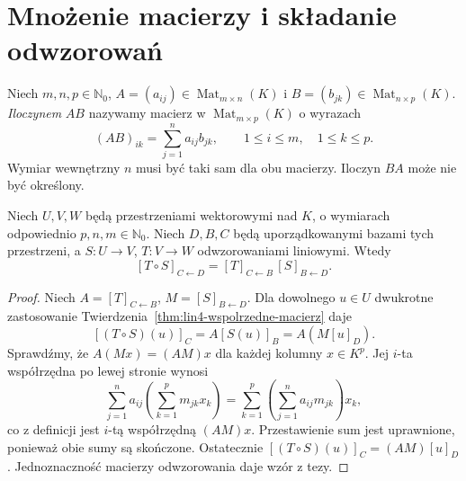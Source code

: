 \section{Mnożenie macierzy i składanie odwzorowań}
\label{sec:lin4-mnozenie}

\begin{definicja}
\label{def:lin4-iloczyn-macierzy}
Niech \(m,n,p\in\mathbb N_0\),
\(A=(a_{ij})\in\operatorname{Mat}_{m\times n}(K)\)
i \(B=(b_{jk})\in\operatorname{Mat}_{n\times p}(K)\).
\emph{Iloczynem} \(AB\) nazywamy macierz
w \(\operatorname{Mat}_{m\times p}(K)\)
o wyrazach
\[
 (AB)_{ik}=\sum_{j=1}^{n}a_{ij}b_{jk},
 \qquad 1\leq i\leq m,\quad 1\leq k\leq p.
\]
Wymiar wewnętrzny \(n\) musi być taki sam
dla obu macierzy. Iloczyn \(BA\) może
nie być określony.
\end{definicja}

\begin{twierdzenie}
\label{thm:lin4-macierz-zlozenia}
Niech \(U,V,W\) będą przestrzeniami
wektorowymi nad \(K\), o wymiarach
odpowiednio \(p,n,m\in\mathbb N_0\).
Niech \(D,B,C\) będą uporządkowanymi bazami
tych przestrzeni, a \(S\colon U\to V\),
\(T\colon V\to W\) odwzorowaniami liniowymi.
Wtedy
\[
 [T\circ S]_{C\leftarrow D}
 =[T]_{C\leftarrow B}\,[S]_{B\leftarrow D}.
\]
\end{twierdzenie}
\begin{proof}
Niech \(A=[T]_{C\leftarrow B}\),
\(M=[S]_{B\leftarrow D}\).
Dla dowolnego \(u\in U\)
dwukrotne zastosowanie
Twierdzenia~\ref{thm:lin4-wspolrzedne-macierz}
daje
\[
 [(T\circ S)(u)]_C
 =A[S(u)]_B
 =A(M[u]_D).
\]
Sprawdźmy, że \(A(Mx)=(AM)x\)
dla każdej kolumny \(x\in K^p\).
Jej \(i\)-ta współrzędna po lewej stronie
wynosi
\[
 \sum_{j=1}^{n}a_{ij}
   \left(\sum_{k=1}^{p}m_{jk}x_k\right)
 =\sum_{k=1}^{p}
   \left(\sum_{j=1}^{n}a_{ij}m_{jk}\right)x_k,
\]
co z definicji jest \(i\)-tą współrzędną
\((AM)x\). Przestawienie sum jest uprawnione,
ponieważ obie sumy są skończone.
Ostatecznie
\([(T\circ S)(u)]_C=(AM)[u]_D\).
Jednoznaczność macierzy odwzorowania
daje wzór z tezy.
\end{proof}


